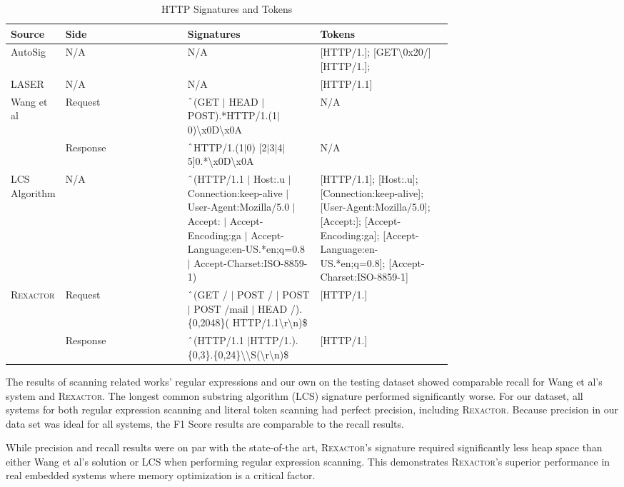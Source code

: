 \begin{table*}[t]
  \centering
  \begin{tabular}{|p{0.12\linewidth}|l|p{0.3\linewidth}|p{0.3\linewidth}|}
 \hline
 Source & Side & Signatures & Tokens \\ [0.5ex]
 \hline\hline
 AutoSig \cite{AutoSig} & N/A & N/A & [HTTP/1.]; [GET\textbackslash0x20/] [HTTP/1.];\\
 \hline
 LASER \cite{LASER} & N/A & N/A & [HTTP/1.1] \\
 \hline
 Wang et al \cite{WANG2012992} & Request & $\string^$(GET $\vert$ HEAD $\vert$ POST).*HTTP/1.(1$\vert$0)\textbackslash x0D\textbackslash x0A & N/A\\
 \cline{2-4}
  & Response & $\string^$HTTP/1.(1$\vert$0) [2$\vert$3$\vert$4$\vert$5]0.*\textbackslash x0D\textbackslash x0A & N/A \\
 \hline
 LCS Algorithm \cite{VinothGeorge2013EfficientRE} & N/A & $\string^$(HTTP/1.1 $\vert$ Host:.u $\vert$ Connection:keep-alive $\vert$ User-Agent:Mozilla/5.0 $\vert$ Accept: $\vert$ Accept-Encoding:ga $\vert$ Accept-Language:en-US.*en;q=0.8 $\vert$ Accept-Charset:ISO-8859-1)  & [HTTP/1.1]; [Host:.u]; [Connection:keep-alive]; [User-Agent:Mozilla/5.0]; [Accept:]; [Accept-Encoding:ga]; [Accept-Language:en-US.*en;q=0.8]; [Accept-Charset:ISO-8859-1]\\
 \hline
 \textsc{Rexactor} & Request & $\string^$(GET / $\vert$ POST / $\vert$ POST $\vert$ POST /mail $\vert$ HEAD /).\{0,2048\}( HTTP/1.1\textbackslash r\textbackslash n)\$ & [HTTP/1.]\\
 \cline{2-4}
 & Response & $\string^$(HTTP/1.1 $\vert$HTTP/1.).\{0,3\}.\{0,24\}\textbackslash\textbackslash S(\textbackslash r\textbackslash n)\$ & [HTTP/1.] \\ [1ex]
 \hline
  \end{tabular}
  \caption{HTTP Signatures and Tokens}
  \label{table:http}
\end{table*}

The results of scanning related works' regular expressions and our own on the testing dataset showed comparable recall for Wang et al's system and \textsc{Rexactor}. The longest common substring algorithm (LCS) signature performed significantly worse. For our dataset, all systems for both regular expression scanning and literal token scanning had perfect precision, including \textsc{Rexactor}. Because precision in our data set was ideal for all systems, the F1 Score results are comparable to the recall results.

While precision and recall results were on par with the state-of-the art, \textsc{Rexactor}'s signature required significantly less heap space than either Wang et al's solution or LCS when performing regular expression scanning. This demonstrates \textsc{Rexactor}'s superior performance in real embedded systems where memory optimization is a critical factor.

